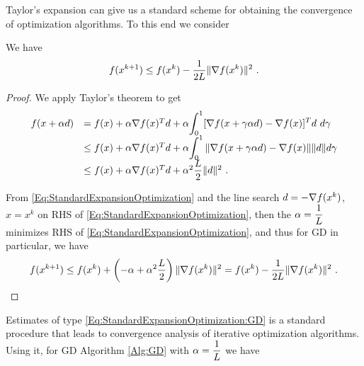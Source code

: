 Taylor's expansion can give us a standard scheme for obtaining the convergence of optimization algorithms. To this end we consider

\begin{lemma}\label{Lm:DescentLemma}
We have
\begin{equation}\label{Eq:StandardExpansionOptimization:GD}
f(x^{k+1})\leq f(x^k)-\dfrac{1}{2L}\|\nabla f(x^k)\|^2 \ .
\end{equation}
\end{lemma}

\begin{proof} We apply Taylor's theorem to get \begin{equation}\label{Eq:StandardExpansionOptimization}
\begin{array}{ll}
f(x+\alpha d)& =f(x)+\alpha \nabla f(x)^T d+\alpha \displaystyle{\int_0^1 [\nabla f(x+\gamma\alpha d)-\nabla f(x)]^Td \ d\gamma}
\\
&\leq f(x)+\alpha \nabla f(x)^T d+\alpha \displaystyle{\int_0^1 \|\nabla f(x+\gamma\alpha d)-\nabla f(x)\|\|d\|d\gamma}
\\
& \leq f(x)+\alpha \nabla f(x)^T d+\alpha^2\dfrac{L}{2}\|d\|^2 \ .
\end{array}
\end{equation}

From \eqref{Eq:StandardExpansionOptimization} and the line search $d=-\nabla f(x^k)$, $x=x^k$ on RHS of \eqref{Eq:StandardExpansionOptimization}, then
the $\alpha=\dfrac{1}{L}$ minimizes RHS of \eqref{Eq:StandardExpansionOptimization}, and thus for GD in particular, we have
$$
f(x^{k+1})\leq f(x^k)+\left(-\alpha +\alpha^2\dfrac{L}{2}\right)\|\nabla f(x^k)\|^2=f(x^k)-\dfrac{1}{2L}\|\nabla f(x^k)\|^2 \ .
$$
\end{proof}

Estimates of type \eqref{Eq:StandardExpansionOptimization:GD} is a standard procedure that leads to
convergence analysis of iterative optimization algorithms. Using it, for GD Algorithm \ref{Alg:GD} with $\alpha=\dfrac{1}{L}$ we have

